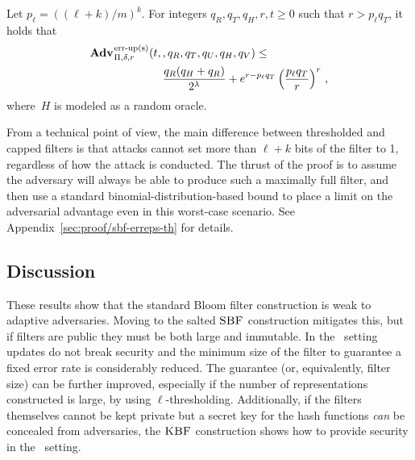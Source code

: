 \begin{theorem}
\label{thm:bf-thr-bound}
\label{thm:sbf-erreps-th}
Let $p_\ell = ((\ell+k)/m)^k$. For integers $q_R, q_T, q_H, r, t \geq 0$ such
that $r > p_\ell q_T$, it holds that
  \begin{equation*}
    \begin{aligned}
      \Adv{\erreps}_{\Pi,\delta,r}(t,\,&,q_R,q_T,q_U,q_H,q_V) \leq \\
        & \frac{q_R(q_H+q_R)}{2^\lambda} + e^{r-p_\ell q_T}\left(\frac{p_\ell q_T}{r}\right)^r
        \,,
    \end{aligned}
  \end{equation*}
  where~$H$ is modeled as a random oracle.
\end{theorem}

From a technical point of view, the main difference between thresholded and
capped filters is that attacks cannot set more than $\ell+k$ bits of the filter
to 1, regardless of how the attack is conducted. The thrust of the proof is to
assume the adversary will always be able to produce such a maximally full
filter, and then use a standard binomial-distribution-based bound to place a
limit on the adversarial advantage even in this worst-case scenario.
%
See Appendix~\ref{sec:proof/sbf-erreps-th} for details.


%  


\subsection{Discussion}

These results show that the standard Bloom filter construction is weak to
adaptive adversaries. Moving to the salted $\textnormal{\textsc{SBF}}$ construction mitigates this,
but if filters are public they must be both large and immutable. In the \erreps\
setting updates do not break security and the minimum size of the filter to
guarantee a fixed error rate is considerably reduced. The guarantee (or,
equivalently, filter size) can be further improved, especially if the number of
representations constructed is large, by using $\ell$-thresholding.
Additionally, if the filters themselves cannot be kept private but a secret key
for the hash functions \emph{can} be concealed from adversaries, the $\textnormal{\textsc{KBF}}$
construction shows how to provide security in the \errep\ setting.

